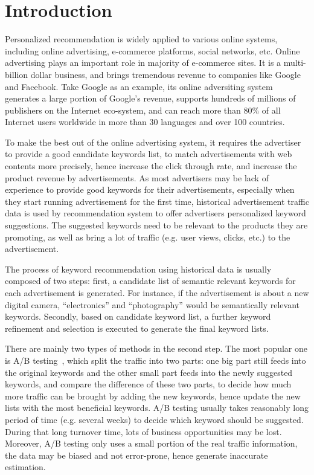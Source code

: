 \section{Introduction}
\label{sec:intro}

Personalized recommendation is widely applied to various online
systems, including online advertising, e-commerce platforms, social
networks, etc. Online advertising plays an important role in majority
of e-commerce sites. It is a multi-billion dollar business, and brings
tremendous revenue to companies like Google and Facebook. Take Google
as an example, its online adversiting system generates a large portion
of Google's revenue, supports hundreds of millions of publishers on
the Internet eco-system, and can reach more than 80\% of all Internet
users worldwide in more than 30 languages and over 100 countries.


To make the best out of the online advertising system, it requires the
advertiser to provide a good candidate keywords list, to match
advertisements with web contents more precisely, hence increase the
click through rate, and increase the product revenue by
advertisements. As most advertisers may be lack of experience to
provide good keywords for their advertisements, especially when they
start running advertisement for the first time, historical
advertisement traffic data is used by recommendation system to offer
advertisers personalized keyword suggestions. The suggested keywords
need to be relevant to the products they are promoting, as well as
bring a lot of traffic (e.g. user views, clicks, etc.) to the
advertisement.

The process of keyword recommendation using historical data is usually
composed of two steps: first, a candidate list of semantic relevant
keywords for each advertisement is generated. For instance, if the
advertisement is about a new digital camera, ``electronics'' and
``photography'' would be semantically relevant keywords. Secondly,
based on candidate keyword list, a further keyword refinement and
selection is executed to generate the final keyword lists.

There are mainly two types of methods in the second step.  The most
popular one is A/B testing~\cite{abtest:wiki}, which split the traffic
into two parts: one big part still feeds into the original keywords
and the other small part feeds into the newly suggested keywords, and
compare the difference of these two parts, to decide how much more
traffic can be brought by adding the new keywords, hence update the
new lists with the most beneficial keywords. A/B testing usually takes
reasonably long period of time (e.g. several weeks) to decide which
keyword should be suggested. During that long turnover time, lots of
business opportunities may be lost. Moreover, A/B testing only uses a
small portion of the real traffic information, the data may be biased
and not error-prone, hence generate inaccurate estimation.


